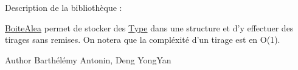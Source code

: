 Description de la bibliothèque \+:

\hyperlink{struct_boite_alea}{Boite\+Alea} permet de stocker des \hyperlink{struct_type}{Type} dans une structure et d'y effectuer des tirages sans remises. On notera que la compléxité d'un tirage est en O(1).

\begin{DoxyAuthor}{Author}
Barthélémy Antonin, Deng Yong\+Yan 
\end{DoxyAuthor}
